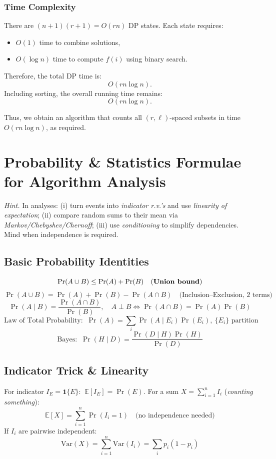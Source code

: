 \documentclass[9pt]{extarticle}
\begin{document}
\subsubsection*{Time Complexity}
There are \((n+1)(r+1) = O(rn)\) DP states.  
Each state requires:
\begin{itemize}
    \item \(O(1)\) time to combine solutions,
    \item \(O(\log n)\) time to compute \(f(i)\) using binary search.
\end{itemize}
Therefore, the total DP time is:
\[
O(rn \log n).
\]
Including sorting, the overall running time remains:
\[
\boxed{O(rn \log n)}.
\]

Thus, we obtain an algorithm that counts all \((r,\ell)\)-spaced subsets in time
\(O(rn \log n)\), as required.

\newpage
\section{Probability \& Statistics Formulae for Algorithm Analysis}
\textit{Hint.} In analyses: (i) turn events into \emph{indicator r.v.'s} and use \emph{linearity of expectation}; (ii) compare random sums to their mean via \emph{Markov/Chebyshev/Chernoff}; (iii) use \emph{conditioning} to simplify dependencies. Mind when independence is required.

\subsection{Basic Probability Identities}
\[
\Pr(A\cup B)\le \Pr(A)+\Pr(B)\quad\text{(\textbf{Union bound})}
\]
\[
\Pr(A\cup B)=\Pr(A)+\Pr(B)-\Pr(A\cap B)\quad\text{(Inclusion--Exclusion, 2 terms)}
\]
\[
\Pr(A\mid B)=\frac{\Pr(A\cap B)}{\Pr(B)},\quad A\perp B\iff \Pr(A\cap B)=\Pr(A)\Pr(B)
\]
\[
\text{Law of Total Probability: }\ \Pr(A)=\sum_i \Pr(A\mid E_i)\Pr(E_i),\ \{E_i\}\text{ partition}
\]
\[
\text{Bayes: }\ \Pr(H\mid D)=\frac{\Pr(D\mid H)\Pr(H)}{\Pr(D)}
\]

\subsection{Indicator Trick \& Linearity}
For indicator $I_E=\mathbf{1}\{E\}$: $\ \mathbb{E}[I_E]=\Pr(E)$.
For a sum $X=\sum_{i=1}^n I_i$ (\emph{counting something}):
\[
\mathbb{E}[X]=\sum_{i=1}^n \Pr(I_i=1)\quad\text{(no independence needed)}
\]
If $I_i$ are pairwise independent: 
\[
\mathrm{Var}(X)=\sum_{i=1}^n \mathrm{Var}(I_i)=\sum_i p_i(1-p_i)
\]
\end{document}
